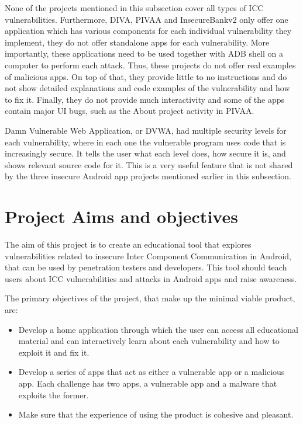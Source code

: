 		None of the projects mentioned in this subsection cover all types of ICC vulnerabilities. Furthermore, DIVA, PIVAA and InsecureBankv2 only offer one application which has various components for each individual vulnerability they implement, they do not offer standalone apps for each vulnerability. More importantly, these applications need to be used together with ADB shell on a computer to perform each attack. Thus, these projects do not offer real examples of malicious apps. On top of that, they provide little to no instructions and do not show detailed explanations and code examples of the vulnerability and how to fix it. Finally, they do not provide much interactivity and some of the apps contain major UI bugs, such as the About project activity in PIVAA.
		
		Damn Vulnerable Web Application, or DVWA, had multiple security levels for each vulnerability, where in each one the vulnerable program uses code that is increasingly secure. It tells the user what each level does, how secure it is, and shows relevant source code for it. This is a very useful feature that is not shared by the three insecure Android app projects mentioned earlier in this subsection.
		
	\section{Project Aims and objectives}
		\label{sec:intro_objective} 
    	
    	The aim of this project is to create an educational tool that explores vulnerabilities related to insecure Inter Component Communication in Android, that can be used by penetration testers and developers. This tool should teach users about ICC vulnerabilities and attacks in Android apps and raise awareness.
        
        The primary objectives of the project, that make up the minimal viable product, are:
        
        \begin{itemize}
            \item Develop a home application through which the user can access all educational material and can interactively learn about each vulnerability and how to exploit it and fix it.
            \item Develop a series of apps that act as either a vulnerable app or a malicious app. Each challenge has two apps, a vulnerable app and a malware that exploits the former.
            \item Make sure that the experience of using the product is cohesive and pleasant.
        \end{itemize}
	
